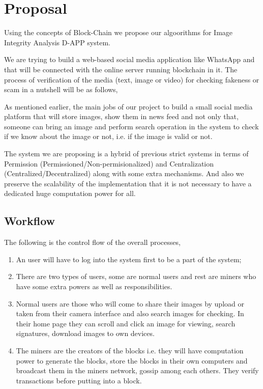 \chapter{Proposal}
\label{Ch4}
\bigskip

Using the concepts of Block-Chain we propose our algoorithms for Image Integrity Analysis D-APP system.

We are trying to build a web-based social media application like WhatsApp and that will be connected with the online server running blockchain in it. The process of verification of the media (text, image or video) for checking fakeness or scam in a nutshell will be as follows,

As mentioned earlier, the main jobs of our project to build a small social media platform that will store images, show them in news feed and not only that, someone can bring an image and perform search operation in the system to check if we know about the image or not, i.e. if the image is valid or not.

The system we are proposing is a hybrid of previous strict systems in terms of Permission (Permissioned/Non-permisionalized) and Centralization (Centralized/Decentralized) along with some extra mechanisms. And also we preserve the scalability of the implementation that it is not necessary to have a dedicated huge computation power for all.

\section{Workflow}
The following is the control flow of the overall processes,
\begin{enumerate}
\item An user will have to log into the system first to be a part of the system;
\item There are two types of users, some are normal users and rest are miners who have some extra powers as well as responsibilities.
\item Normal users are those who will come to share their images by upload or taken from their camera interface and also search images for checking. In their home page they can scroll and click an image for viewing, search signatures, download images to own devices.
\item The miners are the creators of the blocks i.e. they will have computation power to generate the blocks, store the blocks in their own computers and broadcast them in the miners network, gossip among each others. They verify transactions before putting into a block.
\end{enumerate}

